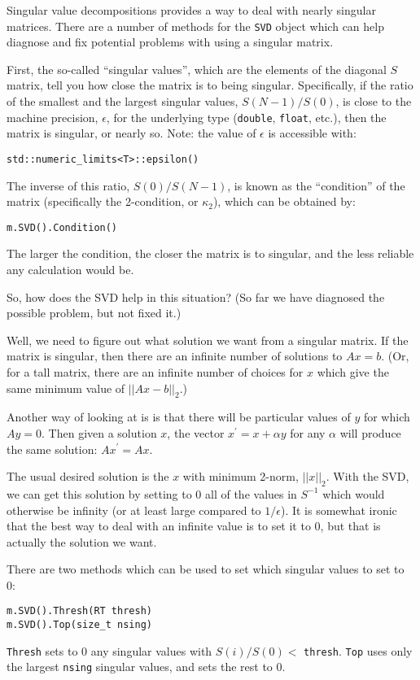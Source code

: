 \documentclass[twoside,letterpaper,11pt]{article}
\renewcommand{\tt}[1]{{\texttt {#1}}}
\begin{document}
Singular value decompositions provides a way to deal with 
nearly singular matrices.  There are a number of methods for the 
\tt{SVD} object which can help diagnose and fix 
potential problems with using a singular matrix.

First, the so-called ``singular values'', which are the elements of the
diagonal $S$ matrix, tell you how close the matrix is to being singular.
Specifically, if the ratio of the smallest and the largest singular values,
$S(N-1)/S(0)$, is close to the machine precision, $\epsilon$, for the 
underlying type (\tt{double}, \tt{float}, etc.),
then the matrix is singular, or nearly so.
Note: the value of $\epsilon$ is accessible with:
\begin{verbatim}
std::numeric_limits<T>::epsilon()
\end{verbatim}

The inverse of this ratio, $S(0)/S(N-1)$, is known as the ``condition'' of the matrix
(specifically the 2-condition, or $\kappa_2$), which can be obtained by:
\begin{verbatim}
m.SVD().Condition()
\end{verbatim}
The larger the condition, the closer the matrix is to singular, and the
less reliable any calculation would be.

So, how does the SVD help in this situation?  (So far we have diagnosed
the possible problem, but not fixed it.)

Well, we need to figure out what solution we want from a singular matrix.
If the matrix is singular, then there are an infinite number of solutions
to $A x = b$.  (Or, for a tall matrix, there are an infinite number of choices for 
$x$ which give the same minimum value of $||A x-b||_2$.)

Another way of looking at is is that there will be particular values of $y$ 
for which $A y = 0$.
Then given a solution $x$, the vector $x^\prime = x + \alpha y$ for any $\alpha$
will produce 
the same solution: $A x^\prime = A x$.

The usual desired solution is the $x$ with minimum 2-norm, $||x||_2$.
With the SVD, we can get this solution by setting to 0 all of the values
in $S^{-1}$ which would otherwise be infinity (or at least large compared
to $1/\epsilon$).  It is somewhat ironic that the best way to deal with 
an infinite value is to set it to 0, but that is actually the solution we want.

There are two methods which can be used to set which 
singular values to set to 0:
\begin{verbatim}
m.SVD().Thresh(RT thresh)
m.SVD().Top(size_t nsing)
\end{verbatim}
\tt{Thresh} sets to 0 any singular values with $S(i)/S(0) <$ \tt{thresh}.
\tt{Top} uses only the largest \tt{nsing} singular values, and sets the rest to 0.
\end{document}
